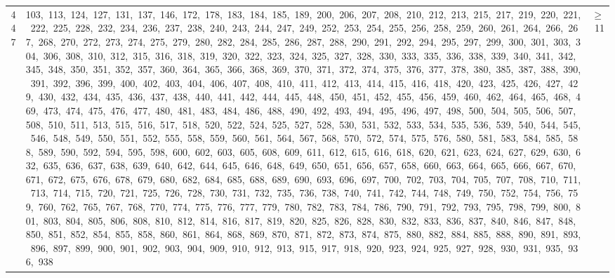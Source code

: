 \begin{longtable}{c|p{}|r}
447 & 103,\ 113,\ 124,\ 127,\ 131,\ 137,\ 146,\ 172,\ 178,\ 183,\ 184,\ 185,\ 189,\ 200,\ 206,\ 207,\ 208,\ 210,\ 212,\ 213,\ 215,\ 217,\ 219,\ 220,\ 221,\ 222,\ 225,\ 228,\ 232,\ 234,\ 236,\ 237,\ 238,\ 240,\ 243,\ 244,\ 247,\ 249,\ 252,\ 253,\ 254,\ 255,\ 256,\ 258,\ 259,\ 260,\ 261,\ 264,\ 266,\ 267,\ 268,\ 270,\ 272,\ 273,\ 274,\ 275,\ 279,\ 280,\ 282,\ 284,\ 285,\ 286,\ 287,\ 288,\ 290,\ 291,\ 292,\ 294,\ 295,\ 297,\ 299,\ 300,\ 301,\ 303,\ 304,\ 306,\ 308,\ 310,\ 312,\ 315,\ 316,\ 318,\ 319,\ 320,\ 322,\ 323,\ 324,\ 325,\ 327,\ 328,\ 330,\ 333,\ 335,\ 336,\ 338,\ 339,\ 340,\ 341,\ 342,\ 345,\ 348,\ 350,\ 351,\ 352,\ 357,\ 360,\ 364,\ 365,\ 366,\ 368,\ 369,\ 370,\ 371,\ 372,\ 374,\ 375,\ 376,\ 377,\ 378,\ 380,\ 385,\ 387,\ 388,\ 390,\ 391,\ 392,\ 396,\ 399,\ 400,\ 402,\ 403,\ 404,\ 406,\ 407,\ 408,\ 410,\ 411,\ 412,\ 413,\ 414,\ 415,\ 416,\ 418,\ 420,\ 423,\ 425,\ 426,\ 427,\ 429,\ 430,\ 432,\ 434,\ 435,\ 436,\ 437,\ 438,\ 440,\ 441,\ 442,\ 444,\ 445,\ 448,\ 450,\ 451,\ 452,\ 455,\ 456,\ 459,\ 460,\ 462,\ 464,\ 465,\ 468,\ 469,\ 473,\ 474,\ 475,\ 476,\ 477,\ 480,\ 481,\ 483,\ 484,\ 486,\ 488,\ 490,\ 492,\ 493,\ 494,\ 495,\ 496,\ 497,\ 498,\ 500,\ 504,\ 505,\ 506,\ 507,\ 508,\ 510,\ 511,\ 513,\ 515,\ 516,\ 517,\ 518,\ 520,\ 522,\ 524,\ 525,\ 527,\ 528,\ 530,\ 531,\ 532,\ 533,\ 534,\ 535,\ 536,\ 539,\ 540,\ 544,\ 545,\ 546,\ 548,\ 549,\ 550,\ 551,\ 552,\ 555,\ 558,\ 559,\ 560,\ 561,\ 564,\ 567,\ 568,\ 570,\ 572,\ 574,\ 575,\ 576,\ 580,\ 581,\ 583,\ 584,\ 585,\ 588,\ 589,\ 590,\ 592,\ 594,\ 595,\ 598,\ 600,\ 602,\ 603,\ 605,\ 608,\ 609,\ 611,\ 612,\ 615,\ 616,\ 618,\ 620,\ 621,\ 623,\ 624,\ 627,\ 629,\ 630,\ 632,\ 635,\ 636,\ 637,\ 638,\ 639,\ 640,\ 642,\ 644,\ 645,\ 646,\ 648,\ 649,\ 650,\ 651,\ 656,\ 657,\ 658,\ 660,\ 663,\ 664,\ 665,\ 666,\ 667,\ 670,\ 671,\ 672,\ 675,\ 676,\ 678,\ 679,\ 680,\ 682,\ 684,\ 685,\ 688,\ 689,\ 690,\ 693,\ 696,\ 697,\ 700,\ 702,\ 703,\ 704,\ 705,\ 707,\ 708,\ 710,\ 711,\ 713,\ 714,\ 715,\ 720,\ 721,\ 725,\ 726,\ 728,\ 730,\ 731,\ 732,\ 735,\ 736,\ 738,\ 740,\ 741,\ 742,\ 744,\ 748,\ 749,\ 750,\ 752,\ 754,\ 756,\ 759,\ 760,\ 762,\ 765,\ 767,\ 768,\ 770,\ 774,\ 775,\ 776,\ 777,\ 779,\ 780,\ 782,\ 783,\ 784,\ 786,\ 790,\ 791,\ 792,\ 793,\ 795,\ 798,\ 799,\ 800,\ 801,\ 803,\ 804,\ 805,\ 806,\ 808,\ 810,\ 812,\ 814,\ 816,\ 817,\ 819,\ 820,\ 825,\ 826,\ 828,\ 830,\ 832,\ 833,\ 836,\ 837,\ 840,\ 846,\ 847,\ 848,\ 850,\ 851,\ 852,\ 854,\ 855,\ 858,\ 860,\ 861,\ 864,\ 868,\ 869,\ 870,\ 871,\ 872,\ 873,\ 874,\ 875,\ 880,\ 882,\ 884,\ 885,\ 888,\ 890,\ 891,\ 893,\ 896,\ 897,\ 899,\ 900,\ 901,\ 902,\ 903,\ 904,\ 909,\ 910,\ 912,\ 913,\ 915,\ 917,\ 918,\ 920,\ 923,\ 924,\ 925,\ 927,\ 928,\ 930,\ 931,\ 935,\ 936,\ 938 & $\ge$ 11 \\

\end{longtable}
